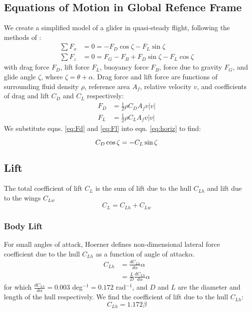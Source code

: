 \documentclass[10pt]{article}
\begin{document}
\subsection{Equations of Motion in Global Refence Frame}
We create a simplified model of a glider in quasi-steady flight, following the methods of \cite{Merckelbach:2009}:
\begin{align}
\label{eq:horiz}\sum F_x &= 0 = -F_D \cos{\zeta} - F_L\sin{\zeta}\\
\label{eq:vert}\sum F_z &= 0 = F_G - F_B + F_D\sin{\zeta} - F_L\cos{\zeta}
\end{align}
with drag force $F_D$, lift force $F_L$, buoyancy force $F_B$, force due to gravity $F_G$, and glide angle $\zeta$, where  $\zeta =\theta +\alpha$.  Drag force and lift force are functions of surrounding fluid density $\rho$, reference area $A_f$, relative velocity $v$, and coefficients of drag and lift $C_D$ and $C_L$ respectively:
\begin{align}
\label{eq:Fd}F_D &= \frac{1}{2}\rho C_D A_f v|v|\\
\label{eq:Fl}F_L &= \frac{1}{2}\rho C_L A_f v|v|
\end{align}
We substitute eqns. \ref{eq:Fd} and \ref{eq:Fl} into eqn. \ref{eq:horiz} to find:

\begin{equation}\label{eq:balance}
C_D \cos{\zeta}= -C_L \sin{\zeta}\\
\end{equation}



\subsection{Lift}
The total coefficient of lift $C_L$ is the sum of lift due to the hull $C_{Lh}$ and lift due to the wings $C_{Lw}$
\begin{equation}
C_L = C_{Lh} + C_{Lw}
\end{equation}

\subsubsection{Body Lift}
For small angles of attack, Hoerner \cite[pg. 13-2 and 19-13]{Hoerner:1985} defines non-dimensional lateral force coefficient due to the hull $C_{Lh}$ as a function of angle  of attack$\alpha$. 
\begin{equation}
\begin{split}
C_{Lh} &= \frac{dC_{Lh}}{d\alpha}\alpha\\
&= \frac{L}{D}\frac{dC_{Lh}}{d\alpha}\alpha
\end{split}
\end{equation}
for which $\frac{dC_{Lh}}{d\alpha}=0.003$ deg$^{-1} = 0.172 $ rad$^{-1}$, and $D$ and $L$ are the diameter and length of the hull respectively.  We find the coefficient of lift due to the hull $C_{Lh}$:
\begin{equation}
C_{Lh} = 1.172\beta
\end{equation}
\end{document}
